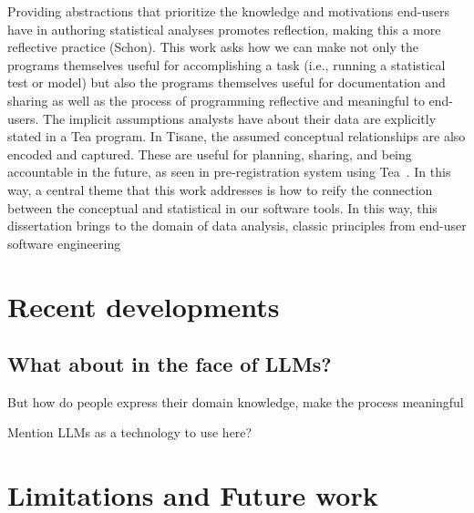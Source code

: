 Providing abstractions that prioritize the knowledge and motivations end-users
have in authoring statistical analyses promotes reflection, making this a more
reflective practice (Schon). This work asks how we can make not only the
programs themselves useful for accomplishing a task (i.e., running a statistical
test or model) but also the programs themselves useful for documentation and
sharing as well as the process of programming reflective and meaningful to
end-users. The implicit assumptions analysts have about their data are
explicitly stated in a Tea program. In Tisane, the assumed conceptual
relationships are also encoded and captured. These are useful for planning,
sharing, and being accountable in the future, as seen in pre-registration system
using Tea~\cite{rock}. In this way, a central theme that this work addresses is
how to reify the connection between the conceptual and statistical in our
software tools. In this way, this dissertation brings to the domain of data
analysis, classic principles from end-user software engineering


\section{Recent developments}
\subsection{What about in the face of LLMs?}

But how do people express their domain knowledge, make the process meaningful

Mention LLMs as a technology to use here?

\section{Limitations and Future work}

